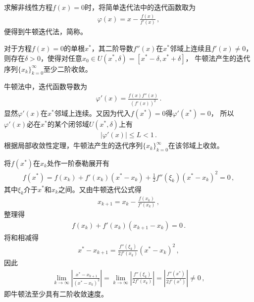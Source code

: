 求解非线性方程$f(x)=0$时，将简单迭代法中的迭代函数取为
\begin{align}\label{eq:02ex0325}
    \varphi(x)=x-\frac{f(x)}{f'(x)}\, ,
\end{align}
便得到牛顿迭代法，简称。

\begin{theorem}
    对于方程$f(x)=0$的单根$x^*$，其二阶导数$f''(x)$在$x^*$邻域上连续且$f'(x)\neq0$，
    则存在$\delta>0$，使得对任意$x_0\in U(x^*,\delta)=[x^*-\delta,x^*+\delta]$，
    牛顿法产生的迭代序列$\{x_k\}_{k=0}^\infty$至少二阶收敛。
\end{theorem}
\begin{prove}
    牛顿法中，迭代函数导数为
    \begin{align}\label{eq:02ex0326}
        \varphi'(x)=\frac{f(x)f''(x)}{(f'(x))^2}\, .
    \end{align}
    显然$\varphi'(x)$在$x^*$邻域上连续。又因为代入$f(x^*)=0$得$\varphi'(x^*)=0$，
    所以$\varphi'(x)$必在$x^*$的某个闭邻域$U(x^*,\delta)$上有
    \begin{align}\label{eq:02ex0327}
        |\varphi'(x)|\le L<1\, .
    \end{align}
    根据局部收敛性定理，牛顿法产生的迭代序列$\{x_k\}_{k=0}^\infty$在该邻域上收敛。

    将$f(x^*)$在$x_k$处作一阶泰勒展开有
    \begin{align}\label{eq:02ex0328}
        f(x^*)=f(x_k)+f'(x_k)(x^*-x_k)+\frac{1}{2}f''(\xi_k)(x^*-x_k)^2=0\, ,
    \end{align}
    其中$\xi_k$介于$x^*$和$x_k$之间。又由牛顿迭代公式得
    \begin{align}\label{eq:02ex0329}
        x_{k+1}=x_k-\frac{f(x_k)}{f'(x_k)}\, ,
    \end{align}
    整理得
    \begin{align}\label{eq:02ex0330}
        f(x_k)+f'(x_k)(x_{k+1}-x_k)=0\, .
    \end{align}
    将和相减得
    \begin{align}\label{eq:02ex0331}
        x^*-x_{k+1}=\frac{f''(\xi_k)}{2f'(x_k)}(x^*-x_k)^2\, ,
    \end{align}
    因此
    \begin{align}\label{eq:02ex0332}
        \lim\limits_{k\rightarrow\infty}{\left|\frac{x^*-x_{k+1}}{(x^*-x_k)^2}\right|}=\lim\limits_{k\rightarrow\infty}{\left|\frac{f''(\xi_k)}{2f'(x_k)}\right|}=\left|\frac{f''(x^*)}{2f'(x^*)}\right|\neq0\, ,
    \end{align}
    即牛顿法至少具有二阶收敛速度。
\end{prove}